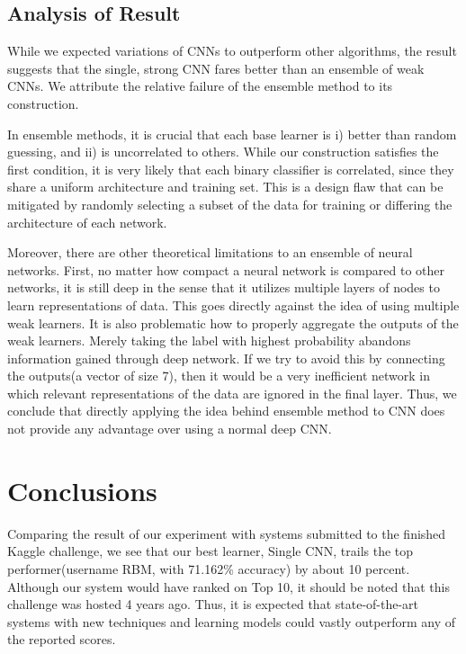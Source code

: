 \documentclass[11pt]{article}
\begin{document}
	\subsection{Analysis of Result}
While we expected variations of CNNs to outperform other algorithms, the result suggests that the single, strong CNN fares better than an ensemble of weak CNNs. We attribute the relative failure of the ensemble method to its construction.

In ensemble methods, it is crucial that each base learner is i) better than random guessing, and ii) is uncorrelated to others. While our construction satisfies the first condition, it is very likely that 
each binary classifier is correlated, since they share a uniform architecture and training set. This is a design flaw that can be mitigated by randomly selecting a subset of the data for training or differing the architecture of each network.

Moreover, there are other theoretical limitations to an ensemble of neural networks. First, no matter how compact a neural network is compared to other networks, it is still deep in the sense that it utilizes multiple layers of nodes to learn representations of data. This goes directly against the idea of using multiple weak learners. It is also problematic how to properly aggregate the outputs of the weak learners. Merely taking the label with highest probability abandons information gained through deep network. If we try to avoid this by connecting the outputs(a vector of size 7), then it would be a very inefficient network in which relevant representations of the data are ignored in the final layer. Thus, we conclude that directly applying the idea behind ensemble method to CNN does not provide any advantage over using a normal deep CNN. 

	
	\section{Conclusions}
	Comparing the result of our experiment with systems submitted to the finished Kaggle challenge, we see that our best learner, Single CNN, trails the top performer(username RBM, with 71.162\% accuracy) by about 10 percent. Although our system would have ranked on Top 10, it should be noted that this challenge was hosted 4 years ago. Thus, it is expected that state-of-the-art systems with new techniques and learning models could vastly outperform any of the reported scores.
	
\end{document}
